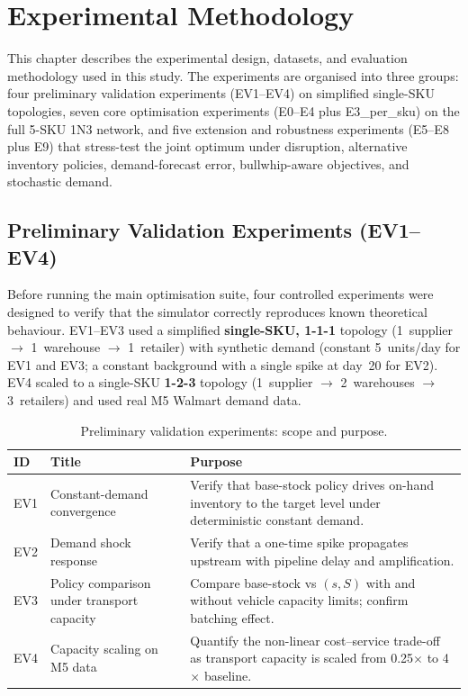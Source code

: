 \chapter{Experimental Methodology}
\label{chap:methodology}

This chapter describes the experimental design, datasets, and evaluation
methodology used in this study.  The experiments are organised into three
groups: four preliminary validation experiments (EV1--EV4) on simplified
single-SKU topologies, seven core optimisation experiments
(E0--E4 plus E3\_per\_sku) on the full 5-SKU 1N3 network, and five
extension and robustness experiments (E5--E8 plus E9) that stress-test
the joint optimum under disruption, alternative inventory policies,
demand-forecast error, bullwhip-aware objectives, and stochastic demand.

\section{Preliminary Validation Experiments (EV1--EV4)}
\label{sec:meth:ev}

Before running the main optimisation suite, four controlled experiments
were designed to verify that the simulator correctly reproduces known
theoretical behaviour.  EV1--EV3 used a simplified \textbf{single-SKU, 1-1-1}
topology (1~supplier $\to$ 1~warehouse $\to$ 1~retailer) with synthetic demand
(constant 5~units/day for EV1 and EV3; a constant background with a single
spike at day~20 for EV2).  EV4 scaled to a
single-SKU \textbf{1-2-3} topology (1~supplier $\to$ 2~warehouses $\to$
3~retailers) and used real M5 Walmart demand data.

\begin{table}[htbp]
  \centering
  \small
  \caption{Preliminary validation experiments: scope and purpose.}
  \label{tab:ev-overview}
  \begin{tabular}{@{}p{1cm}p{4.5cm}p{7cm}@{}}
    \toprule
    ID & Title & Purpose \\
    \midrule
    EV1 & Constant-demand convergence &
          Verify that base-stock policy drives on-hand inventory to the
          target level under deterministic constant demand. \\[4pt]
    EV2 & Demand shock response &
          Verify that a one-time spike propagates upstream with pipeline
          delay and amplification. \\[4pt]
    EV3 & Policy comparison under transport capacity &
          Compare base-stock vs $(s,S)$ with and without vehicle capacity
          limits; confirm batching effect. \\[4pt]
    EV4 & Capacity scaling on M5 data &
          Quantify the non-linear cost--service trade-off as transport
          capacity is scaled from 0.25$\times$ to 4$\times$ baseline. \\
    \bottomrule
  \end{tabular}
\end{table}

